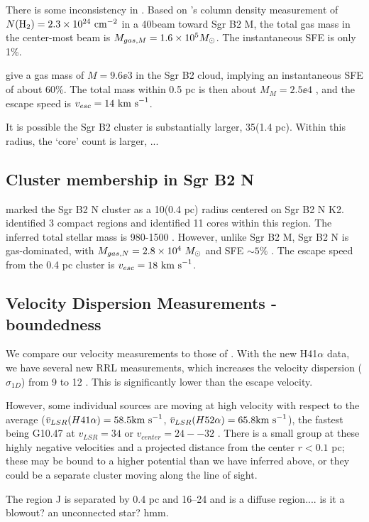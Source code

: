 \documentclass[twocolumn]{aastex61}
\begin{document}
{\color{red} There is some inconsistency in \citet{Schmiedeke2016a}.}
Based on \citet{Schmiedeke2016a}'s column density measurement of $N(\textrm{H}_{2})=2.3\times10^{24}~\textrm{cm}^{-2}$
in a 40\arcsec beam toward Sgr B2 M, the total gas mass in the center-most beam is
$M_{gas, M} = 1.6\times10^{5} M_{\odot}$.  The instantaneous SFE is only 1\%.

\citet{Schmiedeke2016a} give a gas mass of $M=9.6\ee{3}$ \msun in the Sgr B2
cloud, implying an instantaneous SFE of about 60\%.  The total mass within 0.5
pc is then about $M_M = 2.5\ee{4}$ \msun, and the escape speed is
$v_{esc}=14~\textrm{km~s}^{-1}$.



It is possible the Sgr B2 cluster is substantially larger, 35\arcsec (1.4 pc).
Within this radius, the `core' count is larger, ...

\subsection{Cluster membership in Sgr B2 N}
\citet{Schmiedeke2016a} marked the Sgr B2 N cluster as a 10\arcsec  (0.4 pc) radius
centered on Sgr B2 N K2.  \citet{Schmiedeke2016a} identified 3 compact \hii regions
and \citet{Ginsburg2017c} identified 11 cores within this region.  The inferred
total stellar mass is 980-1500 \msun.  However, unlike Sgr B2 M, Sgr B2 N
is gas-dominated, with $M_{gas,N} = 2.8\times10^{4}~M_{\odot}$ and SFE $\sim5\%$ \citep{Schmiedeke2016a}.
The escape speed from the 0.4 pc cluster is $v_{esc} = 18~\textrm{km~s}^{-1}$.


\subsection{Velocity Dispersion Measurements - boundedness}

We compare our velocity measurements to those of \citet{De-Pree2011a}.
With the new H41$\alpha$ data, we have several new RRL measurements, which increases the velocity dispersion ($\sigma_{1D}$)
from 9 \kms to 12 \kms.  This is significantly lower than the escape velocity.

However, some individual sources are moving at high velocity with respect to
the average ($\bar{v}_{LSR}(H41\alpha) = 58.5 \textrm{km~s}^{-1}$,
$\bar{v}_{LSR}(H52\alpha) = 65.8 \textrm{km~s}^{-1}$), the fastest being G10.47 at
$v_{LSR}=34$ \kms or $v_{center}=24--32$ \kms.  There is a small group
at these highly negative velocities and a projected distance from the center $r<0.1$ pc;
these may be bound to a higher potential than we have inferred above, or they
could be a separate cluster moving along the line of sight.

The \hii region J is separated by 0.4 pc and 16--24 \kms and is a diffuse \hii region.... is it a blowout?   an unconnected star?  hmm.


\end{document}
